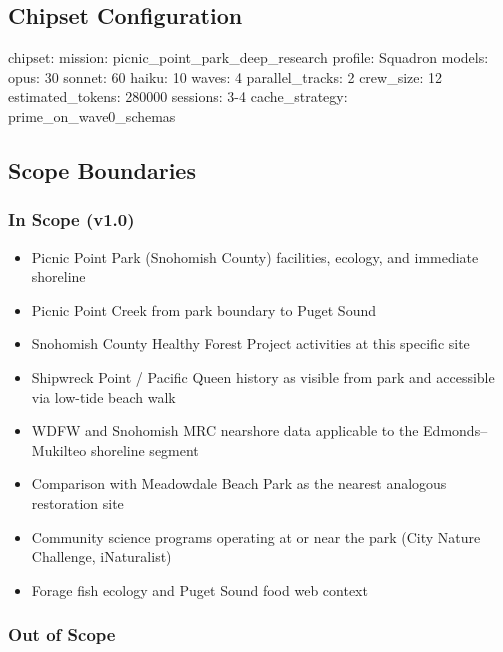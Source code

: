 \documentclass[11pt,letterpaper]{article}
\begin{document}
\subsection{Chipset Configuration}

\begin{asciibox}
chipset:
  mission: picnic_point_park_deep_research
  profile: Squadron
  models:
    opus:    30%
    sonnet:  60%
    haiku:   10%
  waves: 4
  parallel_tracks: 2
  crew_size: 12
  estimated_tokens: 280000
  sessions: 3-4
  cache_strategy: prime_on_wave0_schemas
\end{asciibox}

\subsection{Scope Boundaries}

\subsubsection{In Scope (v1.0)}

\begin{itemize}
  \item Picnic Point Park (Snohomish County) facilities, ecology, and immediate shoreline
  \item Picnic Point Creek from park boundary to Puget Sound
  \item Snohomish County Healthy Forest Project activities at this specific site
  \item Shipwreck Point / Pacific Queen history as visible from park and accessible via low-tide beach walk
  \item WDFW and Snohomish MRC nearshore data applicable to the Edmonds--Mukilteo shoreline segment
  \item Comparison with Meadowdale Beach Park as the nearest analogous restoration site
  \item Community science programs operating at or near the park (City Nature Challenge, iNaturalist)
  \item Forage fish ecology and Puget Sound food web context
\end{itemize}

\subsubsection{Out of Scope}
\end{document}
